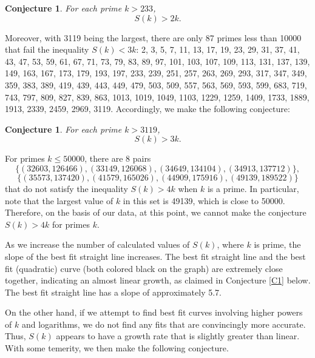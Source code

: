 \documentclass[11pt,reqno]{amsart}
\theoremstyle{plain}
\numberwithin{equation}{section}
\newtheorem{conjecture}[theorem]{Conjecture}
\begin{document}
\begin{conjecture}\label{conjecturemain3}
For each prime $k> 233$,
\begin{equation*}
    S(k)>2k.
    \end{equation*}
    \end{conjecture}

 Moreover, with 3119 being the largest, there are only 87 primes less than 10000 that fail the inequality  $S(k) < 3k$:
    2, 3, 5, 7, 11, 13, 17, 19, 23, 29, 31, 37, 41, 43, 47, 53, 59, 61, 67, 71, 73, 79, 83, 89, 97, 101, 103, 107, 109, 113, 131, 137, 139, 149, 163, 167, 173, 179, 193, 197, 233, 239, 251, 257, 263, 269, 293, 317, 347, 349, 359, 383, 389, 419, 439, 443, 449, 479, 503, 509, 557, 563, 569, 593, 599, 683, 719, 743, 797, 809, 827, 839, 863, 1013, 1019, 1049, 1103, 1229, 1259, 1409, 1733, 1889, 1913, 2339, 2459, 2969, 3119.  Accordingly, we make the following conjecture:

    \begin{conjecture}\label{conjecturemain4}
For each prime $k>3119$,
\begin{equation*}
    S(k)>3k.
    \end{equation*}
    \end{conjecture}

    For primes $k \leq 50000$, there are 8 pairs
    $$\{(32603, 126466), (33149, 126068), (34649, 134104), (34913, 137712)\},$$
     $$\{(35573, 137420), (41579, 165026), (44909, 175916), (49139, 189522)\}$$
      that do not satisfy the inequality $S(k)>4k$ when $k$ is a prime. In particular, note that the largest value of $k$ in this set is 49139, which is close to 50000. Therefore, on the basis of our data, at this  point, we cannot make the conjecture $S(k)>4k$ for primes $k$.


As we increase the number of calculated values of $S(k)$, where $k$ is prime, the slope of the best fit straight line increases.     The best fit straight line and the best fit (quadratic) curve (both colored black on the graph) are extremely close together, indicating an almost linear growth, as claimed  in Conjecture \ref{C1} below. The best fit straight line has a slope of approximately 5.7.



On the other hand, if we attempt to find best fit curves involving higher powers of $k$ and logarithms, we do not find any fits that are convincingly more accurate.  Thus, $S(k)$ appears to have a growth rate that is slightly greater than linear.  With some temerity, we then make the following conjecture.
\end{document}

